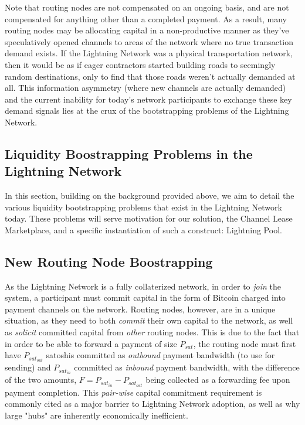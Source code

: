 \documentclass[10pt,a4paper]{article}
\theoremstyle{definition}
\begin{document}
 Note that routing nodes are not compensated on an ongoing basis, and are not
 compensated for anything other than a completed payment. As a result, many
 routing nodes may be allocating capital in a non-productive manner
 \cite{avivCharge} as they've speculatively opened channels to areas of the
 network where no true transaction demand exists. If the Lightning Network was
 a physical transportation network, then it would be as if eager contractors
 started building roads to seemingly random destinations, only to find that
 those roads weren't actually demanded at all. This information asymmetry
 (where new channels are actually demanded) and the current inability for
 today's network participants to exchange these key demand signals lies at the
 crux of the bootstrapping problems of the Lightning Network.

\subsection{Liquidity Boostrapping Problems in the Lightning Network}

In this section, building on the background provided above, we aim to detail
the various liquidity bootstrapping problems that exist in the Lightning
Network today.  These problems will serve motivation for our solution, the
Channel Lease Marketplace, and a specific instantiation of such a construct:
Lightning Pool.


\subsection{New Routing Node Boostrapping}

As the Lightning Network is a fully collaterized network, in order to
\emph{join} the system, a participant must commit capital in the form of
Bitcoin charged into payment channels on the network. Routing nodes, however, are
in a unique situation, as they need to both \emph{commit} their own capital to
the network, as well as \emph{solicit} committed capital from \emph{other}
routing nodes. This is due to the fact that in order to be able to forward a
payment of size $P_{sat}$, the routing node must first have $P_{sat_{out}}$
satoshis committed as \emph{outbound} payment bandwidth (to use for sending)
and $P_{sat_{in}}$ committed as \emph{inbound} payment bandwidth, with the
difference of the two amounts, $F = P_{sat_{in}} -  P_{sat_{out}}$ being collected
as a forwarding fee upon payment completion. This \emph{pair-wise} capital
commitment requirement is commonly cited as a major barrier to Lightning
Network adoption, as well as why large "hubs" are inherently
economically inefficient.
\end{document}
